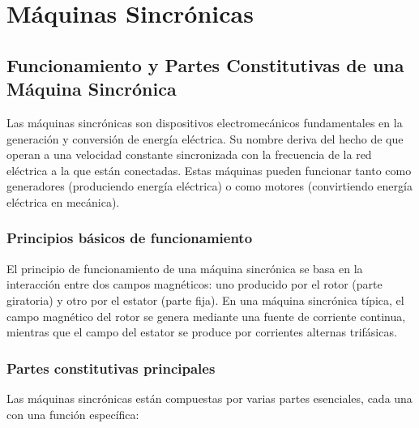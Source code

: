 \documentclass[../main]{subfiles}
\begin{document}
\chapter{Máquinas Sincrónicas}
\section{Funcionamiento y Partes Constitutivas de una Máquina Sincrónica}
Las máquinas sincrónicas son dispositivos electromecánicos fundamentales en la
generación y conversión de energía eléctrica. Su nombre deriva del hecho de que
operan a una velocidad constante sincronizada con la frecuencia de la red 
eléctrica a la que están conectadas. Estas máquinas pueden funcionar tanto como 
generadores (produciendo energía eléctrica) o como motores (convirtiendo 
energía eléctrica en mecánica).
\subsection{Principios básicos de funcionamiento}
El principio de funcionamiento de una máquina sincrónica se basa en la interacción entre dos campos magnéticos: uno producido por el rotor (parte giratoria) y otro por el estator (parte fija). En una máquina sincrónica típica, el campo magnético del rotor se genera mediante una fuente de corriente continua, mientras que el campo del estator se produce por corrientes alternas trifásicas.

\subsection{Partes constitutivas principales}

Las máquinas sincrónicas están compuestas por varias partes esenciales, cada una con una función específica:
\end{document}
